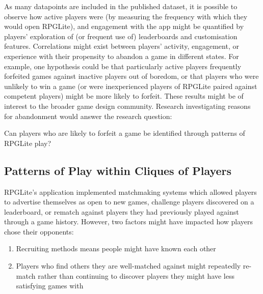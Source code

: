 As many datapoints are included in the published dataset, it is possible to
observe how active players were (by measuring the frequency with which they
would open RPGLite), and engagement with the app might be quantified by players'
exploration of (or frequent use of) leaderboards and customisation features.
Correlations might exist between players' activity, engagement, or experience
with their propensity to abandon a game in different states. For example, one
hypothesis could be that particularly active players frequently forfeited games
against inactive players out of boredom, or that players who were unlikely to
win a game (or were inexperienced players of RPGLite paired against competent
players) might be more likely to forfeit. These results might be of interest to
the broader game design community. Research investigating reasons for
abandonment would answer the research question:

\begin{researchquestion}
    Can players who are likely to forfeit a game be identified through patterns
    of RPGLite play?
\end{researchquestion}
















    
\subsection{Patterns of Play within Cliques of Players}
\label{future_work_rpglite_playerbase_clique_discovery}

RPGLite's application implemented matchmaking systems which allowed players to
advertise themselves as open to new games, challenge players discovered on a
leaderboard, or rematch against players they had previously played against
through a game history. However, two factors might have impacted how players
chose their opponents:

\begin{enumerate}
    \item Recruiting methods means people might have known each other
    \item Players who find others they are well-matched against might repeatedly
    re-match rather than continuing to discover players they might have less
    satisfying games with
\end{enumerate}

